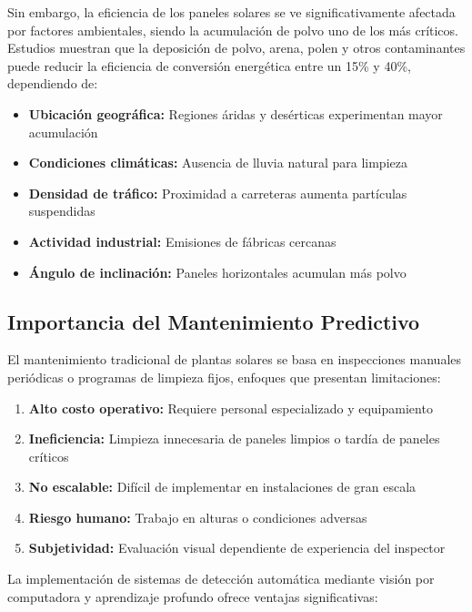 \documentclass[11pt, a4paper]{article}
\begin{document}
Sin embargo, la eficiencia de los paneles solares se ve significativamente afectada por factores ambientales, siendo la acumulación de polvo uno de los más críticos. Estudios muestran que la deposición de polvo, arena, polen y otros contaminantes puede reducir la eficiencia de conversión energética entre un 15\% y 40\%, dependiendo de:

\begin{itemize}
    \item \textbf{Ubicación geográfica:} Regiones áridas y desérticas experimentan mayor acumulación
    \item \textbf{Condiciones climáticas:} Ausencia de lluvia natural para limpieza
    \item \textbf{Densidad de tráfico:} Proximidad a carreteras aumenta partículas suspendidas
    \item \textbf{Actividad industrial:} Emisiones de fábricas cercanas
    \item \textbf{Ángulo de inclinación:} Paneles horizontales acumulan más polvo
\end{itemize}

\subsection{Importancia del Mantenimiento Predictivo}

El mantenimiento tradicional de plantas solares se basa en inspecciones manuales periódicas o programas de limpieza fijos, enfoques que presentan limitaciones:

\begin{enumerate}
    \item \textbf{Alto costo operativo:} Requiere personal especializado y equipamiento
    \item \textbf{Ineficiencia:} Limpieza innecesaria de paneles limpios o tardía de paneles críticos
    \item \textbf{No escalable:} Difícil de implementar en instalaciones de gran escala
    \item \textbf{Riesgo humano:} Trabajo en alturas o condiciones adversas
    \item \textbf{Subjetividad:} Evaluación visual dependiente de experiencia del inspector
\end{enumerate}

La implementación de sistemas de detección automática mediante visión por computadora y aprendizaje profundo ofrece ventajas significativas:
\end{document}
